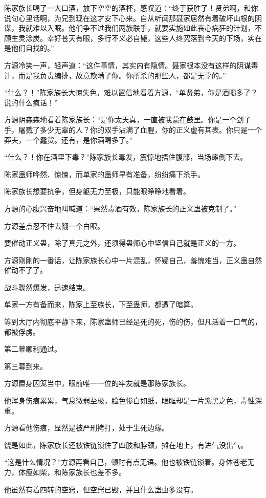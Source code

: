 \begin{this_body}
陈家族长喝了一大口酒，放下空空的酒杯，感叹道：“终于获胜了！贤弟啊，和你说句心里话啊，为兄到现在这才安下心来。自从听闻那聂家居然有着破坏山根的阴谋，我就难以入眠。他们争不过我们两族联手，就要实施如此丧心病狂的计划，不顾生灵涂炭。幸好苍天有眼，多行不义必自毙，这些人终究落到今天的下场，实在是他们自找的。”

方源冷笑一声，轻声道：“这件事情，其实内有隐情。聂家根本没有这样的阴谋毒计，而是我负责编排，故意欺瞒了你。你所杀的那些人，都是无辜的。”

“什么？！”陈家族长大惊失色，难以置信地看着方源，“单贤弟，你是酒喝多了？说的什么疯话！”

方源阴森森地看着陈家族长：“是你太天真，一直被我蒙在鼓里。你是一个刽子手，屠戮了多少无辜的人？你的双手沾满了血腥，你的正义虚有其表。你只是一个莽夫，一个蠢货。还有，是你酒喝多了。”

“什么？！你在酒里下毒？”陈家族长毒发，震惊地捂住腹部，当场瘫倒下去。

陈家蛊师哗然、惊悚，而单家的蛊师早有准备，纷纷痛下杀手。

陈家族长想要抗争，但身躯无力至极，只能眼睁睁地看着。

方源的心腹兴奋地叫喊道：“果然毒酒有效，陈家族长的正义蛊被克制了。”

方源差点忍不住去翻一个白眼。

要催动正义蛊，除了真元之外，还须得蛊师心中坚信自己就是正义的一方。

方源刚刚的一番话，让陈家族长心中一片混乱，怀疑自己，羞愧难当，正义蛊自然催动不了了。

战斗骤然爆发，迅速结束。

单家一方有备而来，陈家上至族长，下至蛊师，都遭了暗算。

等到大厅内彻底平静下来，陈家蛊师已经是死的死，伤的伤，但凡活着一口气的，都被俘虏。

第二幕顺利通过。

第三幕到来。

方源置身囚笼当中，眼前唯一一位的牢友就是那陈家族长。

他浑身伤痕累累，气息微弱至极，脸色惨白如纸，眼眶却是一片紫黑之色，毒性深重。

方源看他伤痕，显然是被严刑拷打，处于生死边缘。

饶是如此，陈家族长还被铁链锁住了四肢和脖颈，摊在地上，有进气没出气。

“这是什么情况？”方源再看自己，顿时有点无语。他也被铁链锁着。身体苍老无力，体瘦如柴，和陈家族长也差不多。

他虽然有着四转的空窍，但空窍已毁，并且什么蛊虫多没有。


\end{this_body}

